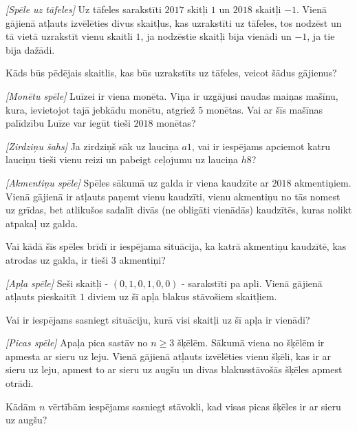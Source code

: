 






\noindent 



\begin{problem}
\textit{[Spēle uz tāfeles]}
Uz tāfeles sarakstīti $2017$ skitļi $1$ un $2018$ skaitļi $-1$. Vienā gājienā atļauts izvēlēties divus skaitļus, kas uzrakstīti uz tāfeles, tos nodzēst un tā vietā uzrakstīt vienu skaitli $1$, ja nodzēstie skaitļi bija vienādi un $-1$, ja tie bija dažādi.

Kāds būs pēdējais skaitlis, kas būs uzrakstīts uz tāfeles, veicot šādus gājienus?

\end{problem}
%

\begin{problem}
\textit{[Monētu spēle]}
Luīzei ir viena monēta. Viņa ir uzgājusi naudas maiņas mašīnu, kura, ievietojot tajā jebkādu monētu, atgriež $5$ monētas.
Vai ar šīs mašīnas palīdzību Luīze var iegūt tieši $2018$ monētas?
\end{problem}
%

\begin{problem}
\textit{[Zirdziņu šahs]}
Ja zirdziņš sāk uz lauciņa $a1$, vai ir iespējams apciemot katru lauciņu tieši vienu reizi un pabeigt ceļojumu uz lauciņa $h8$?
\end{problem}
%

\begin{problem}
\textit{[Akmentiņu spēle]}
Spēles sākumā uz galda ir viena kaudzīte ar $2018$ akmentiņiem. Vienā gājienā ir atļauts paņemt vienu kaudzīti, vienu akmentiņu no tās nomest uz grīdas, bet atlikušos sadalīt divās (ne obligāti vienādās) kaudzītēs, kuras nolikt atpakaļ uz galda. 

Vai kādā šīs spēles brīdī ir iespējama situācija, ka katrā akmentiņu kaudzītē, kas atrodas uz galda, ir tieši $3$ akmentiņi?
\end{problem}
%

\begin{problem}
\textit{[Apļa spēle]}
Seši skaitļi - $(0,1,0,1,0,0)$ - sarakstīti pa apli. Vienā gājienā atļauts pieskaitīt $1$ diviem uz šī apļa blakus stāvošiem skaitļiem.

Vai ir iespējams sasniegt situāciju, kurā visi skaitļi uz šī apļa ir vienādi?
\end{problem}
%

\begin{problem}
\textit{[Picas spēle]}
Apaļa pica sastāv no  $n\ge3$ šķēlēm. Sākumā viena no šķēlēm ir apmesta ar sieru uz leju. Vienā gājienā atļauts izvēlēties vienu šķēli, kas ir ar sieru uz leju, apmest to ar sieru uz augšu un divas blakusstāvošās šķēles apmest otrādi.

Kādām $n$ vērtībām iespējams sasniegt stāvokli, kad visas picas šķēles ir ar sieru uz augšu?
\end{problem}
%


